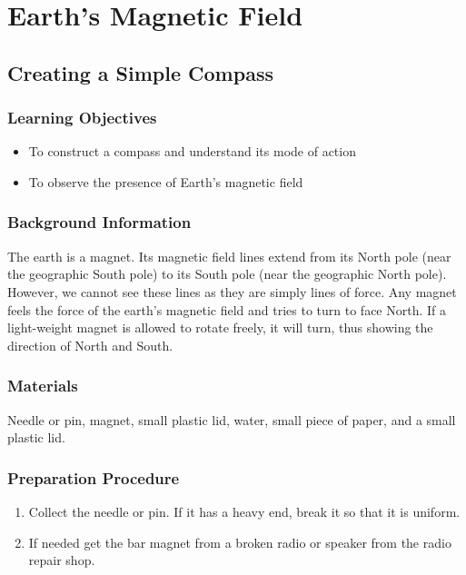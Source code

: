 \section{Earth's Magnetic Field}

\subsection{Creating a Simple Compass}

\subsubsection*{Learning Objectives}
\begin{itemize}
\item{To construct a compass and understand its mode of action}
\item{To observe the presence of Earth's magnetic field} 
\end{itemize}

\subsubsection*{Background Information}
The earth is a magnet.  Its magnetic field lines extend from its North pole (near the geographic South pole) to its South pole (near the geographic North pole).  However, we cannot see these lines as they are simply lines of force.
Any magnet feels the force of the earth's magnetic field and tries to turn to face North.  If a light-weight magnet is allowed to rotate freely, it will turn, thus showing the direction of North and South.

\subsubsection*{Materials}
Needle or pin, magnet, small plastic lid, water, small piece of paper, and a small plastic lid.

\subsubsection*{Preparation Procedure}
\begin{enumerate}
\item{Collect the needle or pin.  If it has a heavy end, break it so that it is uniform.} 
\item{If needed get the bar magnet from a broken radio or speaker from the radio repair shop.}
\end{enumerate}

